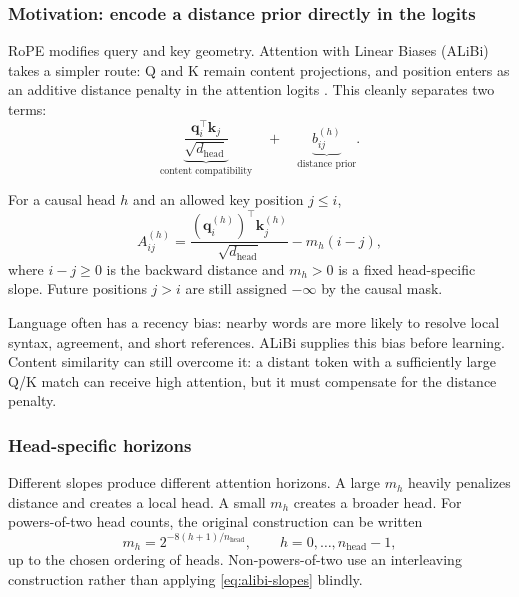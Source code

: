 \documentclass[11pt,a4paper]{article}
\theoremstyle{definition}
\theoremstyle{plain}
\newcommand{\vq}{\bm{q}}
\newcommand{\vk}{\bm{k}}
\newcommand{\dhead}{d_{\mathrm{head}}}
\newcommand{\nhead}{n_{\mathrm{head}}}
\begin{document}
\subsubsection{Motivation: encode a distance prior directly in the logits}

RoPE modifies query and key geometry. Attention with Linear Biases (ALiBi) takes a simpler route: Q and K remain content projections, and position enters as an additive distance penalty in the attention logits \cite{press2022alibi}. This cleanly separates two terms:
\begin{equation}
    \underbrace{\frac{\vq_i^\top\vk_j}{\sqrt{\dhead}}}_{\text{content compatibility}}
    \quad+\quad
    \underbrace{b_{ij}^{(h)}}_{\text{distance prior}}.
\end{equation}

For a causal head $h$ and an allowed key position $j\leq i$,
\begin{equation}\label{eq:alibi-logit}
    A_{ij}^{(h)}
    =\frac{(\vq_i^{(h)})^\top\vk_j^{(h)}}{\sqrt{\dhead}}
    -m_h(i-j),
\end{equation}
where $i-j\geq0$ is the backward distance and $m_h>0$ is a fixed head-specific slope. Future positions $j>i$ are still assigned $-\infty$ by the causal mask.

\begin{motivationbox}
Language often has a recency bias: nearby words are more likely to resolve local syntax, agreement, and short references. ALiBi supplies this bias before learning. Content similarity can still overcome it: a distant token with a sufficiently large Q/K match can receive high attention, but it must compensate for the distance penalty.
\end{motivationbox}

\subsubsection{Head-specific horizons}

Different slopes produce different attention horizons. A large $m_h$ heavily penalizes distance and creates a local head. A small $m_h$ creates a broader head. For powers-of-two head counts, the original construction can be written
\begin{equation}\label{eq:alibi-slopes}
    m_h=2^{-8(h+1)/\nhead},
    \qquad h=0,\ldots,\nhead-1,
\end{equation}
up to the chosen ordering of heads. Non-powers-of-two use an interleaving construction rather than applying \cref{eq:alibi-slopes} blindly.
\end{document}
